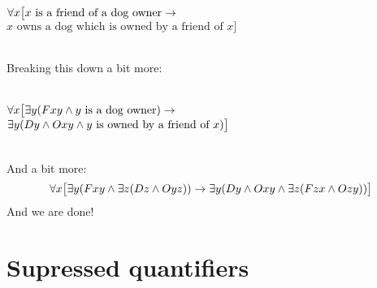 \
\\$\forall x\bigl[x\text{ is a friend of a dog owner}\rightarrow \phantom{x}$\\
\phantom{x}\hfill $x\text{ owns a dog which is owned by a friend of }x\bigr]$

\
\\Breaking this down a bit more:

\
\\$\forall x\bigl[\exists y(Fxy \wedge y\text{ is a dog owner})\rightarrow \phantom{x}$\\
\phantom{x}\hfill $\exists y(Dy \wedge Oxy \wedge y\text{ is owned by a friend of }x)\bigr]$

\
\\And a bit more: 
$$\forall x\bigl[\exists y(Fxy \wedge \exists z(Dz \wedge Oyz)) \rightarrow \exists y(Dy \wedge Oxy \wedge \exists z(Fzx \wedge Ozy))\bigr]$$
And we are done!

\section{Supressed quantifiers}

